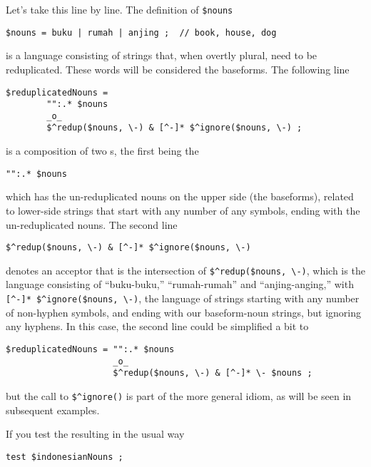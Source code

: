 \noindent
Let's take this line by line.  The definition of \verb!$nouns!

\begin{Verbatim}
$nouns = buku | rumah | anjing ;  // book, house, dog
\end{Verbatim}

\noindent
is a language consisting of strings that, when overtly plural, need to be reduplicated.
These words will be considered the baseforms.
The following line

\begin{Verbatim}
$reduplicatedNouns = 
        "":.* $nouns 
        _o_
        $^redup($nouns, \-) & [^-]* $^ignore($nouns, \-) ;
\end{Verbatim}

\noindent
is a composition of two \fsm{}s, the first being the \fst{} 

\begin{Verbatim}
"":.* $nouns
\end{Verbatim}

\noindent
which has the un-reduplicated nouns on the upper side (the baseforms), related to lower-side
strings that start with any number of any symbols, ending with the un-reduplicated nouns.
The second line 

\begin{Verbatim}
$^redup($nouns, \-) & [^-]* $^ignore($nouns, \-)
\end{Verbatim}

\noindent
denotes
an acceptor that is the intersection of \verb!$^redup($nouns, \-)!, which is the language
consisting of ``buku-buku,'' ``rumah-rumah'' and ``anjing-anging,'' with 
\verb![^-]* $^ignore($nouns, \-)!, the language of strings starting with any number of
non-hyphen symbols, and ending with our baseform-noun strings, but ignoring any hyphens.
In this case, the second line could be simplified a bit to

\begin{Verbatim}
$reduplicatedNouns = "":.* $nouns 
                     _o_
                     $^redup($nouns, \-) & [^-]* \- $nouns ;
\end{Verbatim}

\noindent
but the call to \verb!$^ignore()! is part of the more general idiom, as will be seen in subsequent
examples.

If you test the resulting \fst{} in the usual way


\begin{Verbatim}
test $indonesianNouns ;
\end{Verbatim}

